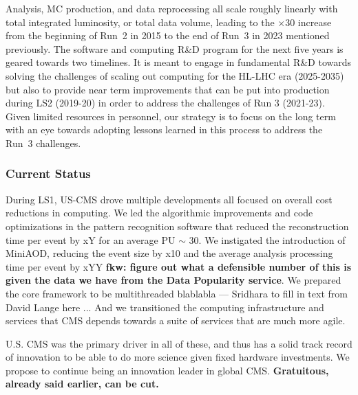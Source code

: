 \documentclass[11pt,a4paper]{article}
\begin{document}
Analysis, MC production, and data reprocessing all scale roughly linearly
with total integrated luminosity, or total data volume, leading to the
$\times 30$ increase from the beginning of Run~2 in 2015 to the end of
Run~3 in 2023 mentioned previously.  The software and computing R\&D program
for the next five years is geared towards two timelines. It is meant to engage
in fundamental R\&D towards solving the challenges of scaling out computing
for the HL-LHC era (2025-2035) but also to provide near term
improvements that can be put into production during LS2 (2019-20) in order
to address the challenges of Run 3 (2021-23). Given limited resources in
personnel, our strategy is to focus on the long term with an eye towards
adopting lessons learned in this process to address the Run~3 challenges.


\subsubsection{Current Status}

During LS1, US-CMS drove multiple developments all focused on overall cost reductions in computing.
We led the algorithmic improvements and code optimizations in the pattern recognition software that reduced the reconstruction
time per event by xY for an average PU $\sim$ 30. We instigated the introduction of MiniAOD, reducing the event size by x10
and the average analysis processing time per event by xYY {\bf fkw: figure out what a defensible number of this is given the data we have
from the Data Popularity service}. 
We prepared the core framework to be multithreaded blablabla --- Sridhara to fill in text from David Lange here ... 
And we transitioned the computing infrastructure and services that CMS depends towards a suite of services that are much more agile.

U.S. CMS was the primary driver in all of these, and thus has a solid track record of innovation to be able to do more science
given fixed hardware investments. We propose to continue being an
innovation leader in global CMS.   {\bf Gratuitous, already said earlier,
  can be cut.}
\end{document}
